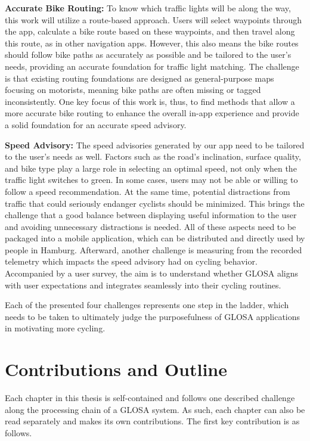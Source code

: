 \textbf{\color{cidarkblue}Accurate Bike Routing:} To know which traffic lights will be along the way, this work will utilize a route-based approach. Users will select waypoints through the app, calculate a bike route based on these waypoints, and then travel along this route, as in other navigation apps. However, this also means the bike routes should follow bike paths as accurately as possible and be tailored to the user's needs, providing an accurate foundation for traffic light matching. The challenge is that existing routing foundations are designed as general-purpose maps focusing on motorists, meaning bike paths are often missing or tagged inconsistently. One key focus of this work is, thus, to find methods that allow a more accurate bike routing to enhance the overall in-app experience and provide a solid foundation for an accurate speed advisory.

\textbf{\color{cidarkblue}Speed Advisory:} The speed advisories generated by our app need to be tailored to the user's needs as well. Factors such as the road's inclination, surface quality, and bike type play a large role in selecting an optimal speed, not only when the traffic light switches to green. In some cases, users may not be able or willing to follow a speed recommendation. At the same time, potential distractions from traffic that could seriously endanger cyclists should be minimized. This brings the challenge that a good balance between displaying useful information to the user and avoiding unnecessary distractions is needed. All of these aspects need to be packaged into a mobile application, which can be distributed and directly used by people in Hamburg. Afterward, another challenge is measuring from the recorded telemetry which impacts the speed advisory had on cycling behavior. Accompanied by a user survey, the aim is to understand whether GLOSA aligns with user expectations and integrates seamlessly into their cycling routines.

Each of the presented four challenges represents one step in the ladder, which needs to be taken to ultimately judge the purposefulness of GLOSA applications in motivating more cycling.

\section{Contributions and Outline}

Each chapter in this thesis is self-contained and follows one described challenge along the processing chain of a GLOSA system. As such, each chapter can also be read separately and makes its own contributions. The first key contribution is as follows.

